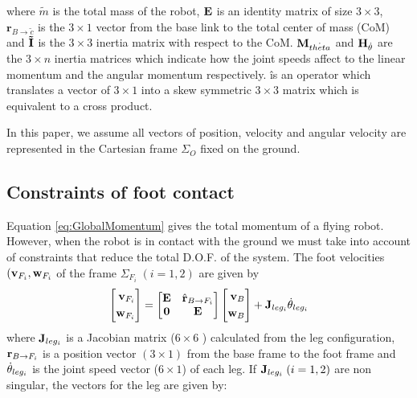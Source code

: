 where $\tilde{m}$ is the total mass of the robot, ${\bf E}$ is an identity matrix of size $3 \times 3$,
$\textbf{r}_{B \rightarrow \tilde{c}}$ is the $3 \times 1$ vector from the base link to the 
total center of mass (CoM) and ${\bf \tilde{I}}$ is the $3 \times 3$ inertia matrix with respect
to the CoM. ${\bf M}_{\dot{theta}}$ and ${\bf H}_{\dot{\theta}}$ are the $3 \times n$ inertia
matrices which indicate how the joint speeds affect to the linear momentum and the angular
momentum respectively. \^ is an operator which translates a vector of $3 \times 1$  into
a skew symmetric $3 \times 3$ matrix which is equivalent to a cross product.
\par
In this paper, we assume all vectors of position, velocity and angular velocity 
are represented in the Cartesian frame $\Sigma_O$ fixed on the ground.

\subsection{Constraints of foot contact}
Equation \ref{eq:GlobalMomentum} gives the total momentum of a flying robot.
However, when the robot is in contact with the ground we must take into account of constraints
that reduce the total D.O.F. of the system. 
The foot velocities $({\bf v}_{F_i}, {\bf w}_{F_i}$ of the frame $\Sigma_{F_i} \; (i=1,2)$ are
given by
\begin{equation}
\left[
\begin{aligned}
{\bf v}_{F_i} \\
{\bf w}_{F_i}\\
\end{aligned}
\right]
=
\left[
\begin{matrix}
{\bf E} & \hat{\bf r}_{B \rightarrow F_i} \\
{\bf 0} & {\bf E}\\
\end{matrix}
\right]
\left[
\begin{aligned}
{\bf v}_{B} \\
{\bf w}_{B}\\
\end{aligned}
\right]
+
{\bf J}_{leg_i} \dot{\bf \theta}_{leg_i}
\end{equation}
where ${\bf J}_{leg_i}$ is a Jacobian matrix ($ 6 \times 6$ ) calculated from the leg configuration,
${\bf r}_{B \rightarrow F_i}$ is a position vector $(3 \times 1 )$ from the base frame to the foot
frame and $\dot{\bf \theta}_{leg_i}$ is the joint speed vector ($ 6 \times 1 $) of each leg.
If ${\bf J}_{leg_i} \; (i=1,2)$  are non singular, the vectors for the leg are given by:

